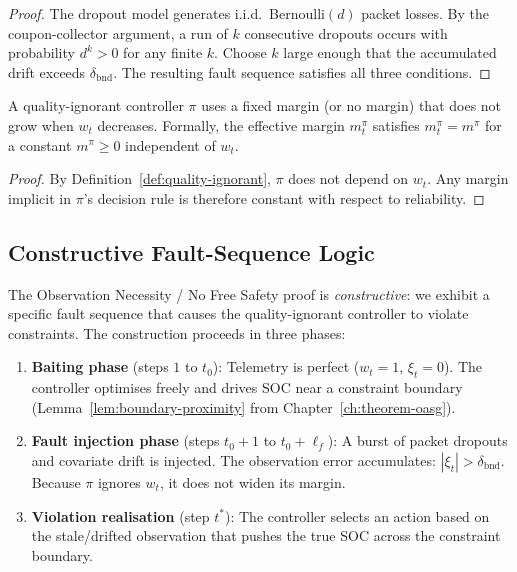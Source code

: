 \begin{proof}
The dropout model generates i.i.d.\ Bernoulli$(d)$ packet losses.
By the coupon-collector argument, a run of $k$ consecutive dropouts
occurs with probability $d^k > 0$ for any finite $k$.  Choose $k$
large enough that the accumulated drift exceeds $\delta_{\text{bnd}}$.
The resulting fault sequence satisfies all three conditions.
\end{proof}

\begin{lemma}
\label{lem:no-margin}
A quality-ignorant controller $\pi$ uses a fixed margin (or no margin)
that does not grow when $w_t$ decreases.  Formally, the effective
margin $m_t^{\pi}$ satisfies
$m_t^{\pi} = m^{\pi}$ for a constant $m^{\pi} \ge 0$ independent
of $w_t$.
\end{lemma}

\begin{proof}
By Definition~\ref{def:quality-ignorant}, $\pi$ does not depend on
$w_t$.  Any margin implicit in $\pi$'s decision rule is therefore
constant with respect to reliability.
\end{proof}

\subsection{Constructive Fault-Sequence Logic}

The Observation Necessity / No Free Safety proof is \emph{constructive}: we exhibit a specific
fault sequence that causes the quality-ignorant controller to violate
constraints.  The construction proceeds in three phases:

\begin{enumerate}
  \item \textbf{Baiting phase} (steps $1$ to $t_0$): Telemetry is
    perfect ($w_t = 1$, $\xi_t = 0$).  The controller optimises
    freely and drives SOC near a constraint boundary
    (Lemma~\ref{lem:boundary-proximity} from Chapter~\ref{ch:theorem-oasg}).

  \item \textbf{Fault injection phase} (steps $t_0 + 1$ to $t_0 + \ell_f$):
    A burst of packet dropouts and covariate drift is injected.
    The observation error accumulates: $|\xi_t| > \delta_{\text{bnd}}$.
    Because $\pi$ ignores $w_t$, it does not widen its margin.

  \item \textbf{Violation realisation} (step $t^*$): The controller
    selects an action based on the stale/drifted observation that
    pushes the true SOC across the constraint boundary.
\end{enumerate}

